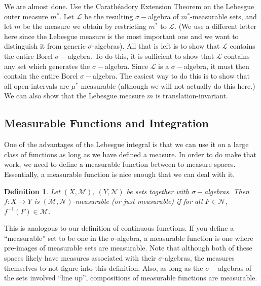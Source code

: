 \documentclass[10pt]{article}         %
\newtheorem{definition}{Definition}[section]
\theoremstyle{remark}
\begin{document}
We are almost done. Use the Carath\'{e}adory Extension Theorem on the Lebesgue outer measure $m^*$. Let $\mathcal{L}$ be the resulting $\sigma-$algebra of $m^*$-measurable sets, and let $m$ be the measure we obtain by restricting $m^*$ to $\mathcal{L}$. (We use a different letter here since the Lebesgue measure is the most important one and we want to distinguish it from generic $\sigma$-algebras). All that is left is to show that $\mathcal{L}$ contains the entire Borel $\sigma-$algebra. To do this, it is sufficient to show that $\mathcal{L}$ contains any set which generates the $\sigma-$algebra. Since $\mathcal{L}$ is a $\sigma-$algebra, it must then contain the entire Borel $\sigma-$algebra. 
The easiest way to do this is to show that all open intervals are $\mu^*$-measurable (although we will not actually do this here.) We can also show that the Lebesgue measure $m$ is translation-invariant.

\subsection{Measurable Functions and Integration}

One of the advantages of the Lebesgue integral is that we can use it on a large class of functions as long as we have defined a measure. In order to do make that work, we need to define a measurable function between to measure spaces. Essentially, a measurable function is nice enough that we can deal with it.

\begin{definition}
Let $(X,\mathcal{M})$, $(Y,\mathcal{N})$ be sets together with $\sigma-$algebras. Then $f: X \to Y$ is \emph{$(\mathcal{M},\mathcal{N})$-measurable} (or just \emph{measurable}) if for all $F \in \mathcal{N}$, $f^{-1}(F) \in \mathcal{M}$. 
\end{definition}

This is analogous to our definition of continuous functions. If you define a ``measurable'' set to be one in the $\sigma$-algebra, a measurable function is one where pre-images of measurable sets are measurable. Note that although both of these spaces likely have measures associated with their $\sigma$-algebras, the measures themselves to not figure into this definition. Also, as long as the $\sigma-$algebras of the sets involved ``line up'', compositions of measurable functions are measurable.
\end{document}
